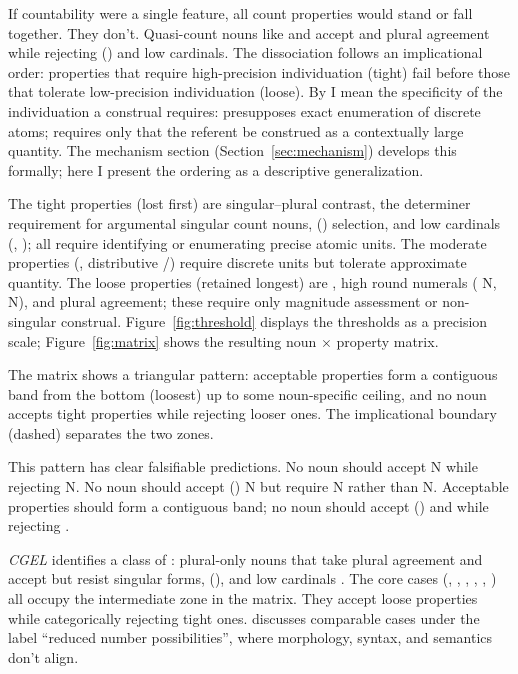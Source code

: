 \documentclass[12pt,a4paper]{article}
\begin{document}
If countability were a single feature, all count properties would stand or fall together. They don't. Quasi-count nouns like  and  accept  and plural agreement while rejecting () and low cardinals. The dissociation follows an implicational order: properties that require high-precision individuation (tight) fail before those that tolerate low-precision individuation (loose). By  I mean the specificity of the individuation a construal requires:  presupposes exact enumeration of discrete atoms;  requires only that the referent be construed as a contextually large quantity. The mechanism section (Section~\ref{sec:mechanism}) develops this formally; here I present the ordering as a descriptive generalization.

The tight properties (lost first) are singular--plural contrast, the determiner requirement for argumental singular count nouns, () selection, and low cardinals (, ); all require identifying or enumerating precise atomic units. The moderate properties (, distributive /) require discrete units but tolerate approximate quantity. The loose properties (retained longest) are , high round numerals ( N,  N), and plural agreement; these require only magnitude assessment or non-singular construal. Figure~\ref{fig:threshold} displays the thresholds as a precision scale; Figure~\ref{fig:matrix} shows the resulting noun $\times$ property matrix.





The matrix shows a triangular pattern: acceptable properties form a contiguous band from the bottom (loosest) up to some noun-specific ceiling, and no noun accepts tight properties while rejecting looser ones. The implicational boundary (dashed) separates the two zones.

This pattern has clear falsifiable predictions. No noun should accept  N while rejecting  N. No noun should accept () N but require  N rather than  N. Acceptable properties should form a contiguous band; no noun should accept () and  while rejecting .

\textit{CGEL} identifies a class of : plural-only nouns that take plural agreement and accept  but resist singular forms, (), and low cardinals \citep[p.~345]{huddleston2002}. The core cases (, , , , , ) all occupy the intermediate zone in the matrix. They accept loose properties while categorically rejecting tight ones. \textcite{corbett2019} discusses comparable cases under the label \enquote{reduced number possibilities}, where morphology, syntax, and semantics don't align.
\end{document}
